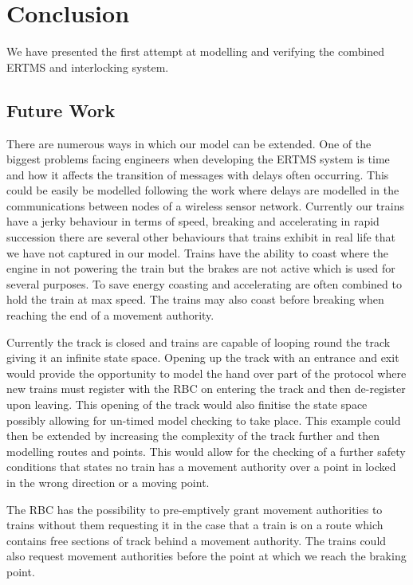 \section{Conclusion}
 We have presented the first attempt at modelling and verifying the combined ERTMS and interlocking system.
\subsection*{Future Work}
There are numerous ways in which our model can be extended. One of the biggest problems facing engineers when developing the ERTMS system is time and how it affects the transition of messages with delays often occurring. This could be easily be modelled following the work \cite{PO07} where delays are modelled in the communications between nodes of a wireless sensor network. Currently our trains have a jerky behaviour in terms of speed, breaking and accelerating in rapid succession there are several other behaviours that trains exhibit in real life that we have not captured in our model. Trains have the ability to coast where the engine in not powering the train but the brakes are not active which is used for several purposes. To save energy coasting and accelerating are often combined to hold the train at max speed. The trains may also coast before breaking when reaching the end of a movement authority.

Currently the track is closed and trains are capable of looping round the track giving it an infinite state space. Opening up the track with an entrance and exit would provide the opportunity to model the hand over part of the protocol where new trains must register with the RBC on entering the track and then de-register upon leaving. This opening of the track would also finitise the state space possibly allowing for un-timed model checking to take place. This example could then be extended by increasing the complexity of the track further and then modelling routes and points. This would allow for the checking of a further safety conditions that states no train has a movement authority over a point in locked in the wrong direction or a moving point.

The RBC has the possibility to pre-emptively grant movement authorities to trains without them requesting it in the case that a train is on a route which contains free sections of track behind a movement authority.  The trains could also request movement authorities before the point at which we reach the braking point.